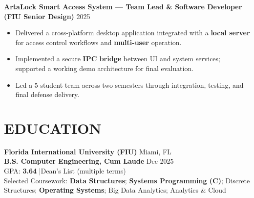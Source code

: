 \documentclass[10pt]{article}
\newcommand{\sep}{\;\;|\;\;}
\begin{document}
\textbf{ArtaLock Smart Access System — Team Lead \& Software Developer (FIU Senior Design)} \hfill 2025
\begin{itemize}
  \small
  \item Delivered a cross-platform desktop application integrated with a \textbf{local server} for access control workflows and \textbf{multi-user} operation.
  \item Implemented a secure \textbf{IPC bridge} between UI and system services; supported a working demo architecture for final evaluation.
  \item Led a 5-student team across two semesters through integration, testing, and final defense delivery.
\end{itemize}
\normalsize

\section{EDUCATION}

\textbf{Florida International University (FIU)} \hfill Miami, FL\\
\textbf{B.S. Computer Engineering, Cum Laude} \hfill Dec 2025\\
\small
GPA: \textbf{3.64} \sep Dean's List (multiple terms)\\
Selected Coursework: \textbf{Data Structures}; \textbf{Systems Programming (C)}; Discrete Structures; \textbf{Operating Systems}; Big Data Analytics; Analytics \& Cloud
\normalsize
\end{document}

